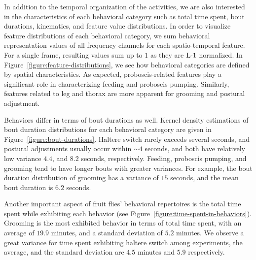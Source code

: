 In addition to the temporal organization of the activities, we are also interested in the characteristics of each behavioral category such as total time spent, bout durations, kinematics, and feature value distributions.
In order to visualize feature distributions of each behavioral category, we sum behavioral representation values of all frequency channels for each spatio-temporal feature.
For a single frame, resulting values sum up to $1$ as they are $\textnormal{L-}1$ normalized.
In Figure~\ref{figure:feature-distributions}, we see how behavioral categories are defined by spatial characteristics.
As expected, proboscis-related features play a significant role in characterizing feeding and proboscis pumping.
Similarly, features related to leg and thorax are more apparent for grooming and postural adjustment.

Behaviors differ in terms of bout durations as well.
Kernel density estimations of bout duration distributions for each behavioral category are given in Figure~\ref{figure:bout-durations}.
Haltere switch rarely exceeds several seconds, and postural adjustments usually occur within ${\sim}4$ seconds, and both have relatively low variance $4.4$, and $8.2$ seconds, respectively.
Feeding, proboscis pumping, and grooming tend to have longer bouts with greater variances.
For example, the bout duration distribution of grooming has a variance of $15$ seconds, and the mean bout duration is $6.2$ seconds.

Another important aspect of fruit flies' behavioral repertoires is the total time spent while exhibiting each behavior (see Figure~\ref{figure:time-spent-in-behaviors}).
Grooming is the most exhibited behavior in terms of total time spent, with an average of $19.9$ minutes, and a standard deviation of $5.2$ minutes.
We observe a great variance for time spent exhibiting haltere switch among experiments, the average, and the standard deviation are $4.5$ minutes and $5.9$ respectively.

